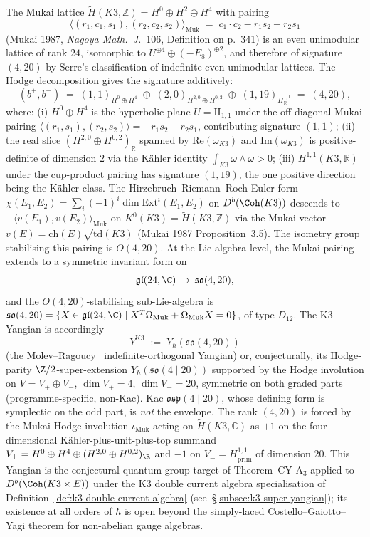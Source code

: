 \begin{remark}
\label{rem:k3e-mukai-signature-super-yangian}
The Mukai lattice $\widetilde{H}(K3, \mathbb{Z}) = H^0 \oplus H^2 \oplus H^4$ with pairing
\[
 \langle (r_1, c_1, s_1), (r_2, c_2, s_2) \rangle_{\mathrm{Muk}}
 \;=\; c_1 \cdot c_2 - r_1 s_2 - r_2 s_1
\]
(Mukai 1987, \emph{Nagoya Math.\ J.}\ 106, Definition on p.\ 341) is an even unimodular lattice of rank $24$, isomorphic to $U^{\oplus 4} \oplus (-E_8)^{\oplus 2}$, and therefore of signature $(4, 20)$ by Serre's classification of indefinite even unimodular lattices. The Hodge decomposition gives the signature additively:
\[
 (b^+, b^-) \;=\; (1, 1)_{H^0 \oplus H^4} \;\oplus\; (2, 0)_{H^{2, 0} \oplus H^{0, 2}} \;\oplus\; (1, 19)_{H^{1, 1}_\mathbb{R}} \;=\; (4, 20),
\]
where: (i) $H^0 \oplus H^4$ is the hyperbolic plane $U = \mathrm{II}_{1, 1}$ under the off-diagonal Mukai pairing $\langle(r_1, s_1), (r_2, s_2)\rangle = -r_1 s_2 - r_2 s_1$, contributing signature $(1, 1)$; (ii) the real slice $(H^{2, 0} \oplus H^{0, 2})_\mathbb{R}$ spanned by $\mathrm{Re}(\omega_{K3})$ and $\mathrm{Im}(\omega_{K3})$ is positive-definite of dimension $2$ via the K\"ahler identity $\int_{K3} \omega \wedge \bar\omega > 0$; (iii) $H^{1, 1}(K3, \mathbb{R})$ under the cup-product pairing has signature $(1, 19)$, the one positive direction being the K\"ahler class. The Hirzebruch--Riemann--Roch Euler form $\chi(E_1, E_2) = \sum_i (-1)^i \dim \mathrm{Ext}^i(E_1, E_2)$ on $D^b(\Coh(K3))$ descends to $-\langle v(E_1), v(E_2) \rangle_{\mathrm{Muk}}$ on $K^0(K3) = \widetilde{H}(K3, \mathbb{Z})$ via the Mukai vector $v(E) = \mathrm{ch}(E) \sqrt{\mathrm{td}(K3)}$ (Mukai 1987 Proposition~3.5). The isometry group stabilising this pairing is $O(4, 20)$. At the Lie-algebra level, the Mukai pairing extends to a symmetric invariant form on
\[
 \mathfrak{gl}(24, \C) \;\supset\; \mathfrak{so}(4, 20),
\]
and the $O(4, 20)$-stabilising sub-Lie-algebra is $\mathfrak{so}(4, 20) = \{X \in \mathfrak{gl}(24, \C) \mid X^T \Omega_{\mathrm{Muk}} + \Omega_{\mathrm{Muk}} X = 0\}$, of type $D_{12}$. The K$3$ Yangian is accordingly
\[
 Y^{\mathrm{K3}} \;:=\; Y_\hbar(\mathfrak{so}(4, 20))
\]
(the Molev--Ragoucy~\cite{MolevRagoucy2008} indefinite-orthogonal Yangian) or, conjecturally, its Hodge-parity $\Z/2$-super-extension $Y_\hbar(\mathfrak{so}(4 \mid 20))$ supported by the Hodge involution on $V = V_+ \oplus V_-$, $\dim V_+ = 4$, $\dim V_- = 20$, symmetric on both graded parts (programme-specific, non-Kac). Kac $\mathfrak{osp}(4 \mid 20)$, whose defining form is symplectic on the odd part, is \emph{not} the envelope. The rank $(4, 20)$ is forced by the Mukai-Hodge involution $\iota_{\mathrm{Muk}}$ acting on $\widetilde{H}(K3, \mathbb{C})$ as $+1$ on the four-dimensional K\"ahler-plus-unit-plus-top summand $V_+ = H^0 \oplus H^4 \oplus (H^{2, 0} \oplus H^{0, 2})_\R$ and $-1$ on $V_- = H^{1, 1}_{\mathrm{prim}}$ of dimension $20$. This Yangian is the conjectural quantum-group target of Theorem~CY-A$_3$ applied to $D^b(\Coh(K3 \times E))$ under the K$3$ double current algebra specialisation of Definition~\ref{def:k3-double-current-algebra} (see~\S\ref{subsec:k3-super-yangian}); its existence at all orders of $\hbar$ is open beyond the simply-laced Costello--Gaiotto--Yagi theorem for non-abelian gauge algebras.

\end{remark}
